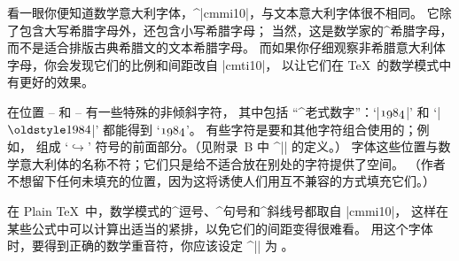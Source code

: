 \noindent 看一眼你便知道数学意大利字体，^|cmmi10|，与文本意大利字体很不相同。
它除了包含大写希腊字母外，还包含小写希腊字母；
当然，这是数学家的^{希腊字母}，而不是适合排版古典希腊文的文本希腊字母。
而如果你仔细观察非希腊意大利体字母，你会发现它们的比例和间距改自 |cmti10|，
以让它们在 \TeX\ 的数学模式中有更好的效果。

在位置 -- 和 -- 有一些特殊的非倾斜字符，
其中包括 ``^{老式数字}''：`|$\mit1984$|' 和 `|$\oldstyle1984$|' 都能得到 `$\mit1984$'。
有些字符是要和其他字符组合使用的；例如， 组成 `$\hookrightarrow$'
符号的前面部分。（见附录~B 中 ^|\hookrightarrow| 的定义。）%
字体这些位置与数学意大利体的名称不符；它们只是给不适合放在别处的字符提供了空间。%
（作者不想留下任何未填充的位置，因为这将诱使人们用互不兼容的方式填充它们。）

在 Plain \TeX\ 中，数学模式的^{逗号}、^{句号}和^{斜线号}都取自 |cmmi10|，
这样在某些公式中可以计算出适当的紧排，以免它们的间距变得很难看。
用这个字体时，要得到正确的数学重音符，你应该设定 ^|\skewchar| 为 。

